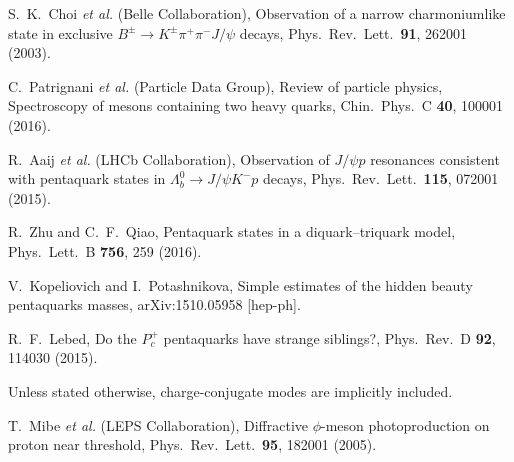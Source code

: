 \documentclass[aps,prl,twocolumn,superscriptaddress,showpacs,preprintnumbers,amsmath,amssymb]{revtex4-1}
\begin{document}
\begin{thebibliography}{99}

  S.~K.~Choi {\it et al.} (Belle Collaboration),
  Observation of a narrow charmoniumlike state in exclusive $B^{\pm} \to K^{\pm} \pi^+ \pi^- J/\psi$ decays,
  Phys.\ Rev.\ Lett.\  {\bf 91}, 262001 (2003).


  C.~Patrignani {\it et al.}  (Particle Data Group),
 Review of particle physics, Spectroscopy of mesons containing two heavy quarks,
  Chin.\ Phys.\ C {\bf 40}, 100001 (2016).



  R.~Aaij {\it et al.} (LHCb Collaboration),
  Observation of $J/\psi p$ resonances consistent with pentaquark states in $\Lambda_b^0\to J/\psi K^-p$ decays,
  Phys.\ Rev.\ Lett.\  {\bf 115}, 072001 (2015).

  R.~Zhu and C.~F.~Qiao,
  Pentaquark states in a diquark–triquark model,
  Phys.\ Lett.\ B {\bf 756}, 259 (2016).

  V.~Kopeliovich and I.~Potashnikova,
 Simple estimates of the hidden beauty pentaquarks masses,
  arXiv:1510.05958 [hep-ph].

  R.~F.~Lebed,
  Do the $P_c^+$ pentaquarks have strange siblings?,
  Phys.\ Rev.\ D {\bf 92}, 114030 (2015).



Unless stated otherwise, charge-conjugate modes are implicitly included.

  T.~Mibe {\it et al.} (LEPS Collaboration),
  Diffractive $\phi$-meson photoproduction on proton near threshold,
  Phys.\ Rev.\ Lett.\  {\bf 95}, 182001 (2005).



\end{thebibliography}
\end{document}
